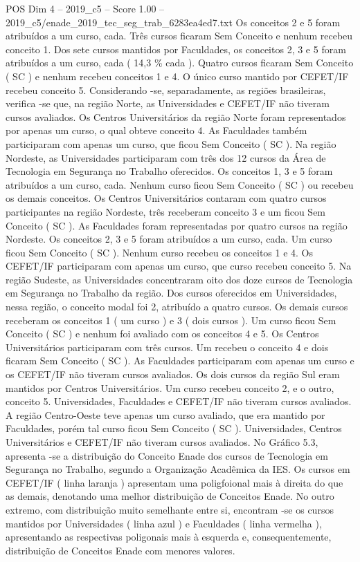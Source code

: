 \begin{textsample}{POS Dim 4 – 2019\_c5 – Score 1.00 – 2019\_c5/enade\_2019\_tec\_seg\_trab\_6283ea4ed7.txt}
Os conceitos 2 e 5 foram atribuídos a um curso, cada.
Três cursos ficaram Sem Conceito e nenhum recebeu conceito 1.
Dos sete cursos mantidos por Faculdades, os conceitos 2, 3 e 5 foram atribuídos a um curso, cada ( 14,3 \% cada ).
Quatro cursos ficaram Sem Conceito ( SC ) e nenhum recebeu conceitos 1 e 4.
O único curso mantido por CEFET/IF recebeu conceito 5.
Considerando -se, separadamente, as regiões brasileiras, verifica -se que, na região Norte, as Universidades e CEFET/IF não tiveram cursos avaliados.
Os Centros Universitários da região Norte foram representados por apenas um curso, o qual obteve conceito 4.
As Faculdades também participaram com apenas um curso, que ficou Sem Conceito ( SC ).
Na região Nordeste, as Universidades participaram com três dos 12 cursos da Área de Tecnologia em Segurança no Trabalho oferecidos.
Os conceitos 1, 3 e 5 foram atribuídos a um curso, cada.
Nenhum curso ficou Sem Conceito ( SC ) ou recebeu os demais conceitos.
Os Centros Universitários contaram com quatro cursos participantes na região Nordeste, três receberam conceito 3 e um ficou Sem Conceito ( SC ).
As Faculdades foram representadas por quatro cursos na região Nordeste.
Os conceitos 2, 3 e 5 foram atribuídos a um curso, cada.
Um curso ficou Sem Conceito ( SC ).
Nenhum curso recebeu os conceitos 1 e 4.
Os CEFET/IF participaram com apenas um curso, que curso recebeu conceito 5.
Na região Sudeste, as Universidades concentraram oito dos doze cursos de Tecnologia em Segurança no Trabalho da região.
Dos cursos oferecidos em Universidades, nessa região, o conceito modal foi 2, atribuído a quatro cursos.
Os demais cursos receberam os conceitos 1 ( um curso ) e 3 ( dois cursos ).
Um curso ficou Sem Conceito ( SC ) e nenhum foi avaliado com os conceitos 4 e 5.
Os Centros Universitários participaram com três cursos.
Um recebeu o conceito 4 e dois ficaram Sem Conceito ( SC ).
As Faculdades participaram com apenas um curso e os CEFET/IF não tiveram cursos avaliados.
Os dois cursos da região Sul eram mantidos por Centros Universitários.
Um curso recebeu conceito 2, e o outro, conceito 5.
Universidades, Faculdades e CEFET/IF não tiveram cursos avaliados.
A região Centro-Oeste teve apenas um curso avaliado, que era mantido por Faculdades, porém tal curso ficou Sem Conceito ( SC ).
Universidades, Centros Universitários e CEFET/IF não tiveram cursos avaliados.
No Gráfico 5.3, apresenta -se a distribuição do Conceito Enade dos cursos de Tecnologia em Segurança no Trabalho, segundo a Organização Acadêmica da IES.
Os cursos em CEFET/IF ( linha laranja ) apresentam uma poligfoional mais à direita do que as demais, denotando uma melhor distribuição de Conceitos Enade.
No outro extremo, com distribuição muito semelhante entre si, encontram -se os cursos mantidos por Universidades ( linha azul ) e Faculdades ( linha vermelha ), apresentando as respectivas poligonais mais à esquerda e, consequentemente, distribuição de Conceitos Enade com menores valores.

\end{textsample}
